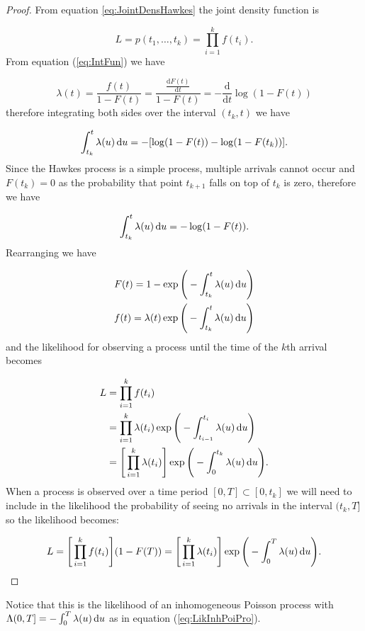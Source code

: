 \begin{proof}
    From equation \ref{eq:JointDensHawkes} the joint density function is
    
    \begin{equation*}
        L = p(t_1, \dots, t_k) = \prod_{i = 1}^k f(t_i).
    \end{equation*}
    From equation (\ref{eq:IntFun}) we have
    
    \begin{equation*}
        \lambda(t) = \frac{f(t)}{1 - F(t)} = \frac{\frac{\mathrm{d} F(t)}{\mathrm{d} t}}{1 - F(t)} = - \frac{\mathrm{d}}{\mathrm{d} t} \log(1 - F(t))
    \end{equation*}
    therefore integrating both sides over the interval $(t_k, t)$ we have
    
    \begin{equation*}
        \int_{t_k}^t \lambda (u) \operatorname{d}\!{u} = - [\log(1 - F(t)) - \log(1 - F(t_k))].
    \end{equation*}
    Since the Hawkes process is a simple process, multiple arrivals cannot occur and $F(t_k) = 0$ as the probability that point $t_{k+1}$ falls on top of $t_k$ is zero, therefore we have
    
    \begin{equation}\label{logCDF}
        \int_{t_k}^t \lambda (u) \operatorname{d}\!{u} = - \log(1 - F(t)).
    \end{equation}
    Rearranging we have
    
    \begin{align*}
        & F(t) = 1 - \exp \Bigg( -\int_{t_k}^t \lambda(u) \operatorname{d}\!{u} \Bigg) \\
        & f(t) = \lambda(t) \exp \Bigg( -\int_{t_k}^t \lambda(u) \operatorname{d}\!{u} \Bigg)
    \end{align*}
    and the likelihood for observing a process until the time of the $k$th arrival becomes
    
    \begin{align*}
        L &= \prod_{i=1}^k f(t_i) \\
        &= \prod_{i=1}^k \lambda(t_i) \exp \Bigg( -\int_{t_{i-1}}^{t_i} \lambda(u) \operatorname{d}\!{u} \Bigg) \\
        &= \Bigg[ \prod_{i=1}^k \lambda(t_i) \Bigg]\exp \Bigg( -\int_{0}^{t_k} \lambda(u) \operatorname{d}\!{u} \Bigg).
    \end{align*}
    When a process is observed over a time period $[0, T] \subset [0, t_k]$ we will need to include in the likelihood the probability of seeing no arrivals in the interval $(t_k, T]$ so the likelihood becomes:
    
    \begin{equation*}
        L = \Bigg[ \prod_{i=1}^k f(t_i) \Bigg] (1 - F(T)) = \Bigg[ \prod_{i=1}^k \lambda(t_i) \Bigg]\exp \Bigg( -\int_{0}^{T} \lambda(u) \operatorname{d}\!{u} \Bigg).
    \end{equation*}
\end{proof}
Notice that this is the likelihood of an inhomogeneous Poisson process with $\Lambda(0, T] = -\int_{0}^T \lambda(u) \operatorname{d}\!{u}$ as in equation (\ref{eq:LikInhPoiPro}).

